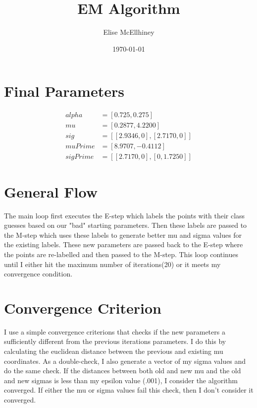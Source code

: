 \documentclass[11pt]{amsart}
\title{EM Algorithm}
\author{Elise McEllhiney}
\date{\today}                                           %
\begin{document}
\maketitle

\section{Final Parameters}
\begin{align}
alpha & = [ 0.725 , 0.275 ] \\
mu & = [ 0.2877 , 4.2200 ] \\
sig & = [ [ 2.9346 , 0 ] , [ 2.7170 , 0 ] ] \\
muPrime & = [ 8.9707 ,  -0.4112 ] \\
sigPrime & = [ [ 2.7170 , 0 ] ,   [ 0, 1.7250 ] ]
\end{align}

\section{General Flow}
The main loop first executes the E-step which labels the points with their class guesses based on our "bad" starting parameters.  Then these labels are passed to the M-step which uses these labels to generate better mu and sigma values for the existing labels.  These new parameters are passed back to the E-step where the points are re-labelled and then passed to the M-step.  This loop continues until I either hit the maximum number of iterations(20) or it meets my convergence condition.

\section{Convergence Criterion}
I use a simple convergence criterions that checks if the new parameters a sufficiently different from the previous iterations parameters.  I do this by calculating the euclidean distance between the previous and existing mu coordinates.  As a double-check, I also generate a vector of my sigma values and do the same check.  If the distances between both old and new mu and the old and new sigmas is less than my epsilon value (.001), I consider the algorithm converged.  If either the mu or sigma values fail this check, then I don't consider it converged.
\end{document}
